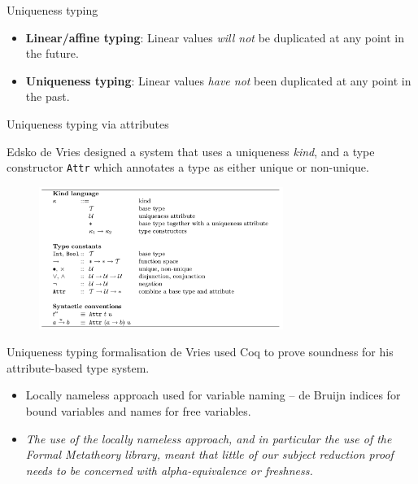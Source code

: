 \documentclass[10pt]{beamer}
\begin{document}
\begin{frame}{Uniqueness typing}

\begin{itemize}
\item \textbf{Linear/affine typing}: Linear values \textit{will not} be duplicated at any point in the future.
\item \textbf{Uniqueness typing}: Linear values \textit{have not} been duplicated at any point in the past.
\end{itemize}

\end{frame}

\begin{frame}{Uniqueness typing via attributes}

Edsko de Vries designed a system that uses a uniqueness \textit{kind}, and a type constructor \texttt{Attr} which annotates a type as either unique or non-unique.

\begin{figure}[h]
\centering
\includegraphics[width=300px]{de_Vries_attributes.png}
\label{}
\end{figure}
\end{frame}

\begin{frame}{Uniqueness typing formalisation}
de Vries used Coq to prove soundness for his attribute-based type system.

\begin{itemize}
\item Locally nameless approach used for variable naming -- de Bruijn indices for bound variables and names for free variables.

\item \textit{The use of the locally nameless approach, and in particular the use of the Formal Metatheory library, meant that little of our subject reduction
proof needs to be concerned with alpha-equivalence or freshness.}

\end{itemize}
\end{frame}
\end{document}
